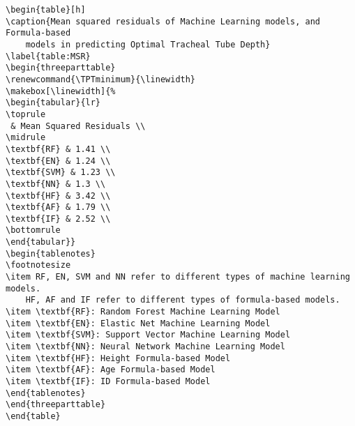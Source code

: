 \documentclass[11pt]{article}
\begin{document}
\begin{Verbatim}[tabsize=4]
\begin{table}[h]
\caption{Mean squared residuals of Machine Learning models, and Formula-based
	models in predicting Optimal Tracheal Tube Depth}
\label{table:MSR}
\begin{threeparttable}
\renewcommand{\TPTminimum}{\linewidth}
\makebox[\linewidth]{%
\begin{tabular}{lr}
\toprule
 & Mean Squared Residuals \\
\midrule
\textbf{RF} & 1.41 \\
\textbf{EN} & 1.24 \\
\textbf{SVM} & 1.23 \\
\textbf{NN} & 1.3 \\
\textbf{HF} & 3.42 \\
\textbf{AF} & 1.79 \\
\textbf{IF} & 2.52 \\
\bottomrule
\end{tabular}}
\begin{tablenotes}
\footnotesize
\item RF, EN, SVM and NN refer to different types of machine learning models.
	HF, AF and IF refer to different types of formula-based models.
\item \textbf{RF}: Random Forest Machine Learning Model
\item \textbf{EN}: Elastic Net Machine Learning Model
\item \textbf{SVM}: Support Vector Machine Learning Model
\item \textbf{NN}: Neural Network Machine Learning Model
\item \textbf{HF}: Height Formula-based Model
\item \textbf{AF}: Age Formula-based Model
\item \textbf{IF}: ID Formula-based Model
\end{tablenotes}
\end{threeparttable}
\end{table}

\end{Verbatim}




\end{document}
